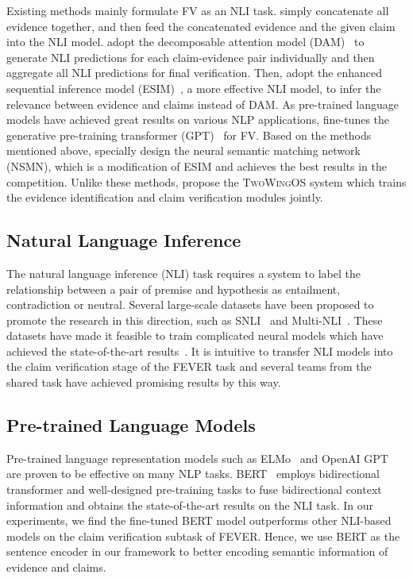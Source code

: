 \documentclass[11pt,a4paper]{article}
\begin{document}
Existing methods mainly formulate FV as an NLI task.  simply concatenate all evidence together, and then feed the concatenated evidence and the given claim into the NLI model.  adopt the decomposable attention model (DAM)~\cite{parikh2016decomposable} to generate NLI predictions for each claim-evidence pair individually and then aggregate all NLI predictions for final verification. Then,  adopt the enhanced sequential inference model (ESIM)~\cite{chen2017enhanced}, a more effective NLI model, to infer the relevance between evidence and claims instead of DAM. As pre-trained language models have achieved great results on various NLP applications,  fine-tunes the generative pre-training transformer (GPT)~\cite{radford2018improving} for FV. Based on the methods mentioned above,  specially design the neural semantic matching network (NSMN), which is a modification of ESIM and achieves the best results in the competition. Unlike these methods,  propose the \textsc{TwoWingOS} system which trains the evidence identification and claim verification modules jointly. 

\subsection{Natural Language Inference}
The natural language inference (NLI) task requires a system to label the relationship between a pair of premise and hypothesis as entailment, contradiction or neutral. Several large-scale datasets have been proposed to promote the research in this direction, such as SNLI~\cite{bowman2015large} and Multi-NLI~\cite{williams2018broad}. These datasets have made it feasible to train complicated neural models which have achieved the state-of-the-art results~\cite{bowman2015large, parikh2016decomposable, sha2016reading, chen2017enhanced, chen2017recurrent, munkhdalai2017neural,  nie2017shortcut, conneau2017supervised, gong2017natural, tay2018compare, ghaeini2018dr}. It is intuitive to transfer NLI models into the claim verification stage of the FEVER task and several teams from the shared task have achieved promising results by this way.

\subsection{Pre-trained Language Models} 
Pre-trained language representation models such as ELMo~\cite{peters2018deep} and OpenAI GPT~\cite{radford2018improving} are proven to be effective on many NLP tasks. BERT~\cite{devlin2018bert} employs bidirectional transformer and well-designed pre-training tasks to fuse bidirectional context information and obtains the state-of-the-art results on the NLI task. In our experiments, we find the fine-tuned BERT model outperforms other NLI-based models on the claim verification subtask of FEVER. Hence, we use BERT as the sentence encoder in our framework to better encoding semantic information of evidence and claims.
\end{document}
